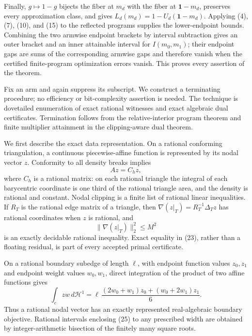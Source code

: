 Finally, \(g\mapsto1-g\) bijects the fiber at \(m_d\) with the fiber at
\(\mathbf1-m_d\), preserves every approximation class, and gives
\(L_d(m_d)=1-U_d(\mathbf1-m_d)\).  Applying (4), (7), (10), and (15) to the
reflected programs supplies the lower-endpoint bounds.  Combining the two
armwise endpoint brackets by interval subtraction gives an outer bracket and
an inner attainable interval for \(I(m_0,m_1)\); their endpoint gaps are sums
of the corresponding armwise gaps and therefore vanish when the certified
finite-program optimization errors vanish.  This proves every assertion of the
theorem.

Fix an arm and again suppress its subscript.  We construct a terminating
procedure; no efficiency or bit-complexity assertion is needed.  The technique
is dovetailed enumeration of exact rational witnesses and exact algebraic
dual certificates.  Termination follows from the relative-interior program
theorem and finite multiplier attainment in the clipping-aware dual theorem.

We first describe the exact data representation.  On a rational conforming
triangulation, a continuous piecewise-affine function is represented by its
nodal vector \(z\).  Conformity to all density breaks implies
\[
 Az=C_hz,                                                     \tag{23}
\]
where \(C_h\) is a rational matrix: on each rational triangle the integral of
each barycentric coordinate is one third of the rational triangle area, and
the density is rational and constant.  Nodal clipping is a finite list of
rational linear inequalities.  If \(R_T\) is the rational edge matrix of a
triangle, then \(\nabla(z|_T)=R_T^{-1}\Delta_Tz\) has rational coordinates
when \(z\) is rational, and
\[
 \|\nabla(z|_T)\|_2^2\le M^2                               \tag{24}
\]
is an exactly decidable rational inequality.  Exact equality in (23), rather
than a floating residual, is part of every accepted primal certificate.

On a rational boundary subedge of length \(\ell\), with endpoint function
values \(z_0,z_1\) and endpoint weight values \(w_0,w_1\), direct integration
of the product of two affine functions gives
\[
 \int_e zw\,d\mathcal H^1
 =\ell\,
   \frac{(2w_0+w_1)z_0+(w_0+2w_1)z_1}{6}.                  \tag{25}
\]
Thus a rational nodal vector has an exactly represented real-algebraic boundary
objective.  Rational intervals enclosing (25) to any prescribed width are
obtained by integer-arithmetic bisection of the finitely many square roots.

